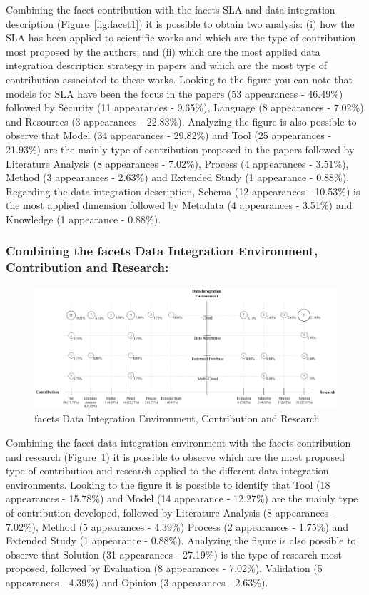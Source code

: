 Combining the facet contribution with the facets SLA and data integration description 
(Figure~\ref{fig:facet1}) it is possible to obtain two analysis: 
(i) how the SLA has been applied to scientific works and which are the type of contribution 
most proposed by the authors; and (ii) which are the most applied data integration description
strategy in papers and which are the most type of contribution associated to these works. 
Looking to the figure you can note that models for SLA have been the focus in the papers 
(53 appearances - 46.49\%) followed by Security (11 appearances - 9.65\%), Language 
(8 appearances - 7.02\%) and Resources (3 appearances - 22.83\%).
Analyzing the figure is also possible to observe that Model (34 appearances - 29.82\%) and 
Tool (25 appearances - 21.93\%) are the mainly type of contribution proposed in the papers 
followed by Literature Analysis (8 appearances - 7.02\%), Process (4 appearances - 3.51\%), 
Method (3 appearances - 2.63\%) and Extended Study (1 appearance - 0.88\%).
Regarding the data integration description, Schema (12 appearances - 10.53\%) is the most 
applied dimension followed by Metadata (4 appearances - 3.51\%) and Knowledge (1 appearance - 0.88\%).

\subsubsection{Combining the facets Data Integration Environment, Contribution
and Research:}

\begin{figure}[h]
\centering
\includegraphics[scale=0.48]{figs/bubble-charts/DI-Environment-Contribution-Research.pdf}
\caption{facets Data Integration Environment, Contribution and Research}\label{fig:facet2}
\end{figure}

Combining the facet data integration environment with the facets contribution and research 
(Figure~\ref{fig:facet2}) it is possible to observe which are the most proposed type of
contribution and research applied to the different data integration environments.  
Looking to the figure it is possible to identify that Tool (18 appearances - 15.78\%) and 
Model (14 appearance - 12.27\%) are the mainly type of contribution developed, 
followed by Literature Analysis (8 appearances - 7.02\%), Method (5 appearances - 4.39\%) 
Process (2 appearances - 1.75\%) and Extended Study (1 appearance - 0.88\%).
Analyzing the figure is also possible to observe that Solution (31 appearances - 27.19\%) is 
the type of research most proposed, followed by Evaluation (8 appearances -
7.02\%), Validation (5 appearances - 4.39\%) and Opinion (3 appearances - 2.63\%).

